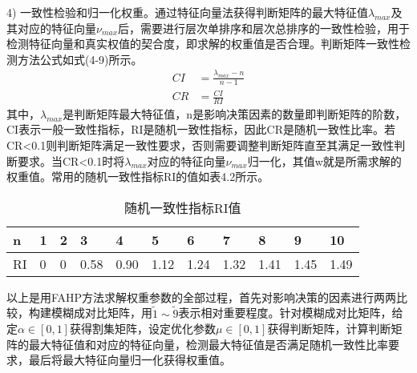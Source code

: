 4) 一致性检验和归一化权重。通过特征向量法获得判断矩阵的最大特征值$\lambda_{max}$及其对应的特征向量$\nu_{max}$后，需要进行层次单排序和层次总排序的一致性检验，用于检测特征向量和真实权值的契合度，即求解的权重值是否合理。判断矩阵一致性检测方法公式如式(4-9)所示。
\begin{equation}
\begin{split}
CI &= \frac{\lambda_{max}-n}{n-1} \\
CR &= \frac{CI}{RI}
\end{split}
\end{equation}
其中，$\lambda_{max}$是判断矩阵最大特征值，n是影响决策因素的数量即判断矩阵的阶数，CI表示一般一致性指标，RI是随机一致性指标，因此CR是随机一致性比率。若CR<0.1则判断矩阵满足一致性要求，否则需要调整判断矩阵直至其满足一致性判断要求。当CR<0.1时将$\lambda_{max}$对应的特征向量$\nu_{max}$归一化，其值w就是所需求解的权重值。常用的随机一致性指标RI的值如表4.2所示。
\begin{table}[htbp]
	\centering\dawu[1.3]
	\caption{随机一致性指标RI值}
	\begin{tabular}{|p{0.8cm}<{\centering}|p{0.8cm}<{\centering}|p{0.8cm}<{\centering}|p{0.8cm}<{\centering}|p{0.8cm}<{\centering}|p{0.8cm}<{\centering}|p{0.8cm}<{\centering}|p{0.8cm}<{\centering}|p{0.8cm}<{\centering}|p{0.8cm}<{\centering}|p{0.8cm}<{\centering}|} \hline
	n & 1 & 2 & 3 & 4 & 5 & 6 & 7 & 8 & 9 & 10 \\ \hline
	RI & 0 & 0 & 0.58 & 0.90 & 1.12 & 1.24 & 1.32 & 1.41 & 1.45 & 1.49 \\ \hline
	\end{tabular}
\end{table}

以上是用FAHP方法求解权重参数的全部过程，首先对影响决策的因素进行两两比较，构建模糊成对比矩阵，用$\widetilde{1}\sim \widetilde{9}$表示相对重要程度。针对模糊成对比矩阵，给定$\alpha\in[0,1]$获得割集矩阵，设定优化参数$\mu \in[0,1]$获得判断矩阵，计算判断矩阵的最大特征值和对应的特征向量，检测最大特征值是否满足随机一致性比率要求，最后将最大特征向量归一化获得权重值。


